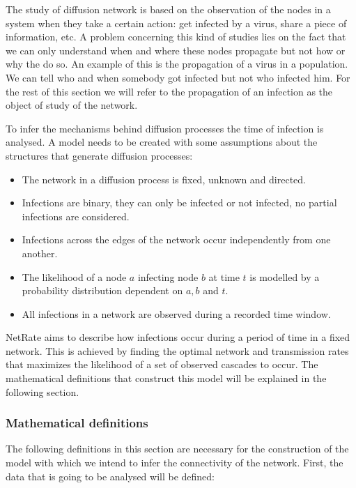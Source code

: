 \documentclass[10pt]{article}
\begin{document}
The study of diffusion network is based on the observation of the nodes in a system when they take a certain action: get infected by a virus, share a piece of information, etc. A problem concerning this kind of studies lies on the fact that we can only understand when and where these nodes propagate but not how or why the do so. An example of this is the propagation of a virus in a population. We can tell who and when somebody got infected but not who infected him. For the rest of this section we will refer to the propagation of an infection as the object of study of the network. 

To infer the mechanisms behind diffusion processes the time of infection is analysed. A model needs to be created with some assumptions about the structures that generate diffusion processes:

\begin{itemize}
\item The network in a diffusion process is fixed, unknown and directed.
\item Infections are binary, they can only be infected or not infected, no partial infections are considered.
\item Infections across the edges of the network occur independently from one another.
\item The likelihood of a node $a$ infecting node $b$ at time $t$ is modelled by a probability distribution dependent on $a, b$ and $t$.
\item All infections in a network are observed during a recorded time window.
\end{itemize}

NetRate aims to describe how infections occur during a period of time in a fixed network. This is achieved by finding the optimal network and transmission rates that maximizes the likelihood of a set of observed cascades to occur. The mathematical definitions that construct this model will be explained in the following section.


\subsubsection{Mathematical definitions}

The following definitions in this section are necessary for the construction of the model with which we intend to infer the connectivity of the network. First, the data that is going to be analysed will be defined:
\end{document}
